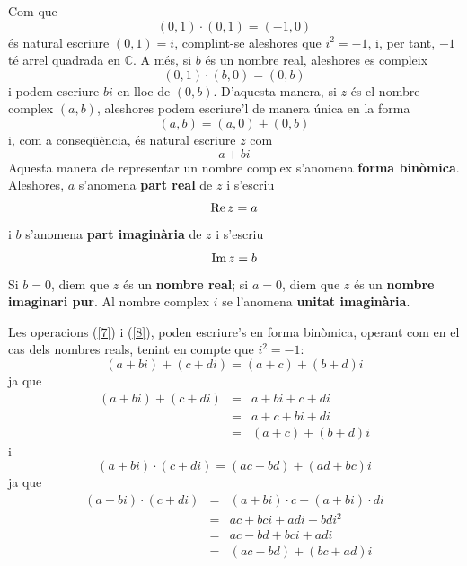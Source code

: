 Com que
\begin{equation*}
(0,1)\cdot (0,1)=(-1,0)
\end{equation*}
és natural escriure $(0,1)=i$, complint-se aleshores que $i^{2}=-1$, i,
per tant, $-1$ té arrel quadrada en $\mathbb{C}$. A més, si $b$
és un nombre real, aleshores es compleix
\begin{equation*}
(0,1)\cdot (b,0)=(0,b)
\end{equation*}
i podem escriure $bi$ en lloc de $(0,b)$. D’aquesta manera, si $z$ és el nombre complex $(a,b)$, aleshores podem escriure’l de manera única
en la forma
\begin{equation*}
(a,b)=(a,0)+(0,b)
\end{equation*}
i, com a conseqüència, és natural escriure $z$ com
\begin{equation*}
a+bi
\end{equation*}
Aquesta manera de representar un nombre complex s’anomena \textbf{forma binòmica}. Aleshores, $a$ s’anomena \textbf{part real} de $z$ i s’escriu
\begin{equation*}
\operatorname{Re}z=a
\end{equation*}
i $b$ s’anomena \textbf{part imaginària} de $z$ i s’escriu
\begin{equation*}
\operatorname{Im}z=b
\end{equation*}
Si $b=0$, diem que $z$ és un \textbf{nombre real}; si $a=0$, diem que $z$ és un \textbf{nombre imaginari pur}. Al nombre
complex $i$ se l’anomena \textbf{unitat imaginària}.

Les operacions (\ref{7}) i (\ref{8}), poden escriure’s en forma binòmica, operant com en el cas dels nombres reals, tenint en compte que $i^{2}=-1$:
\begin{equation*}
(a+bi)+(c+di)=(a+c)+(b+d)i
\end{equation*}
ja que
\begin{eqnarray*}
(a+bi)+(c+di) &=&a+bi+c+di \\
&=&a+c+bi+di \\
&=&(a+c)+(b+d)i
\end{eqnarray*}
i
\begin{equation*}
(a+bi)\cdot (c+di)=(ac-bd)+(ad+bc)i
\end{equation*}
ja que
\begin{eqnarray*}
(a+bi)\cdot (c+di) &=&(a+bi)\cdot c+(a+bi)\cdot di \\
&=&ac+bci+adi+bdi^{2} \\
&=&ac-bd+bci+adi \\
&=&(ac-bd)+(bc+ad)i
\end{eqnarray*}

